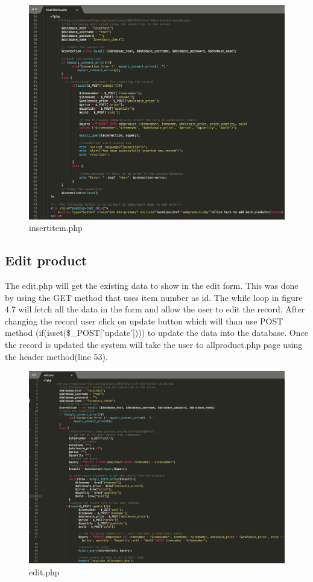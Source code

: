 \begin{figure}[H]
\centering
    \includegraphics[scale=0.37]
    {implement_image/addproduct.png}
    \caption{insertitem.php}
    \label{fig:insertitem.php}
\end{figure}

\subsection{Edit  product}
The edit.php will get the existing data to show in the edit form. This was done by using the GET method that uses item number as id. The while loop in figure 4.7 will fetch all the data in the form and allow the user to edit the record. After changing the record user click on update button which will than use POST method (if(isset(\$\_POST['update']))) to update the data into the database. Once the record is updated the system will take the user to allproduct.php page using the header method(line 53).

\begin{figure}[H]
\centering
    \includegraphics[scale=0.34]
    {implement_image/editproduct.png}
    \caption{edit.php}
    \label{fig:edit.php}
\end{figure}

